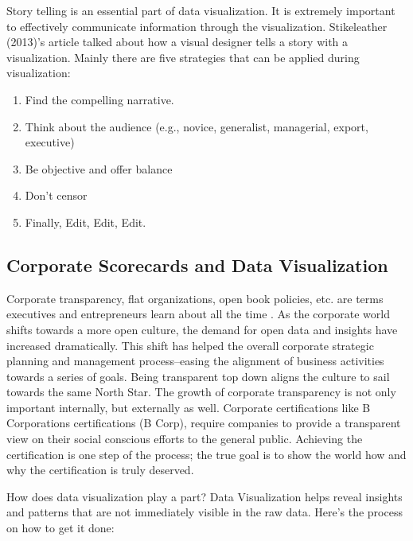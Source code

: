 \documentclass[]{book}
\providecommand{\tightlist}{%
  \setlength{\itemsep}{0pt}\setlength{\parskip}{0pt}}
\theoremstyle{definition}
\theoremstyle{definition}
\theoremstyle{definition}
\theoremstyle{remark}
\begin{document}
Story telling is an essential part of data visualization. It is
extremely important to effectively communicate information through the
visualization. Stikeleather (2013)'s article talked about how a visual
designer tells a story with a visualization. Mainly there are five
strategies that can be applied during visualization:

\begin{enumerate}
\def\labelenumi{\arabic{enumi}.}
\tightlist
\item
  Find the compelling narrative.
\item
  Think about the audience (e.g., novice, generalist, managerial,
  export, executive)
\item
  Be objective and offer balance
\item
  Don't censor
\item
  Finally, Edit, Edit, Edit.
\end{enumerate}

\subsection{Corporate Scorecards and Data
Visualization}\label{corporate-scorecards-and-data-visualization}

Corporate transparency, flat organizations, open book policies, etc. are
terms executives and entrepreneurs learn about all the time
\citep{SCORECARDS}. As the corporate world shifts towards a more open
culture, the demand for open data and insights have increased
dramatically. This shift has helped the overall corporate strategic
planning and management process--easing the alignment of business
activities towards a series of goals. Being transparent top down aligns
the culture to sail towards the same North Star. The growth of corporate
transparency is not only important internally, but externally as well.
Corporate certifications like B Corporations certifications (B Corp),
require companies to provide a transparent view on their social
conscious efforts to the general public. Achieving the certification is
one step of the process; the true goal is to show the world how and why
the certification is truly deserved.

How does data visualization play a part? Data Visualization helps reveal
insights and patterns that are not immediately visible in the raw data.
Here's the process on how to get it done:
\end{document}
